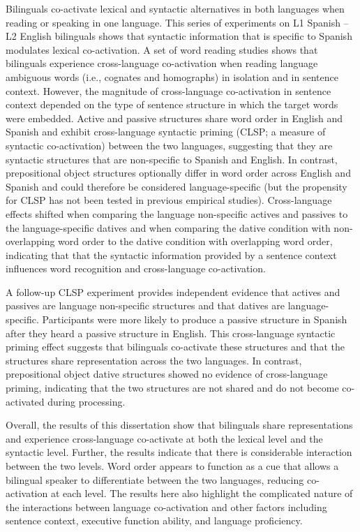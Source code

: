 
Bilinguals co-activate lexical and syntactic alternatives in both languages when reading or speaking in one language. This series of experiments on L1 Spanish -- L2 English bilinguals shows that syntactic information that is specific to Spanish modulates lexical co-activation. A set of word reading studies shows that bilinguals experience cross-language co-activation when reading language ambiguous words (i.e., cognates and homographs) in isolation and in sentence context. However, the magnitude of cross-language co-activation in sentence context depended on the type of sentence structure in which the target words were embedded. Active and passive structures share word order in English and Spanish and exhibit cross-language syntactic priming (CLSP; a measure of syntactic co-activation) between the two languages, suggesting that they are syntactic structures that are non-specific to Spanish and English. In contrast, prepositional object structures optionally differ in word order across English and Spanish and could therefore be considered language-specific (but the propensity for CLSP has not been tested in previous empirical studies). Cross-language effects shifted when comparing the language non-specific actives and passives to the language-specific datives and when comparing the dative condition with non-overlapping word order to the dative condition with overlapping word order, indicating that that the syntactic information provided by a sentence context influences word recognition and cross-language co-activation.

A follow-up CLSP experiment provides independent evidence that actives and passives are language non-specific structures and that datives are language-specific. Participants were more likely to produce a passive structure in Spanish after they heard a passive structure in English. This cross-language syntactic priming effect suggests that bilinguals co-activate these structures and that the structures share representation across the two languages. In contrast, prepositional object dative structures showed no evidence of cross-language priming, indicating that the two structures are not shared and do not become co-activated during processing.  

Overall, the results of this dissertation show that bilinguals share representations and experience cross-language co-activate at both the lexical level and the syntactic level. Further, the results indicate that there is considerable interaction between the two levels. Word order appears to function as a cue that allows a bilingual speaker to differentiate between the two languages, reducing co-activation at each level. The results here also highlight the complicated nature of the interactions between language co-activation and other factors including sentence context, executive function ability, and language proficiency. 
